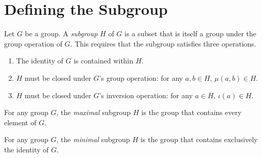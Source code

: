 \section{Defining the Subgroup}

\begin{definition}
    \label{definition : Subgroup}
    \leanok
    Let $G$ be a group. A \textit{subgroup} $H$ of $G$ is a subset that is itself a group under the group operation of $G$. This requires that the subgroup satisfies three operations.

    \begin{enumerate}
        \item The identity of $G$ is contained within $H$.
        \item $H$ must be closed under $G$'s group operation: for any $a,b \in H$, $\mu(a,b) \in H$.
        \item $H$ must be closed under $G$'s inversion operation: for any $a \in H$, $\iota(a) \in H$.
    \end{enumerate}
\end{definition}

\begin{definition}
    \label{definition : Maximal}
    \leanok
    For any group $G$, the \textit{maximal} subgroup $H$ is the group that contains every element of $G$.
\end{definition}

\begin{definition}
    \label{definition : Minimal}
    \leanok
    For any group $G$, the \textit{minimal} subgroup $H$ is the group that contains exclusively the identity of $G$.
\end{definition}

